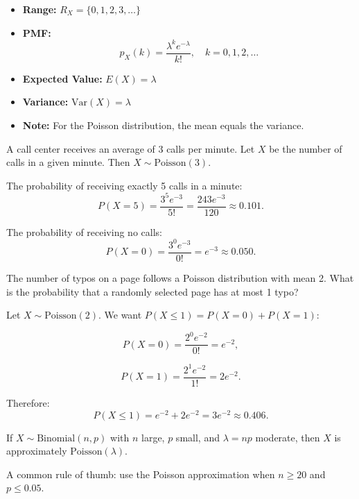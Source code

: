 \begin{itemize}
    \item \textbf{Range:} \(R_X = \{0, 1, 2, 3, \ldots\}\)
    
    \item \textbf{PMF:}
    \[
    p_X(k) = \frac{\lambda^k e^{-\lambda}}{k!}, \quad k = 0, 1, 2, \ldots
    \]
    
    \item \textbf{Expected Value:} \(E(X) = \lambda\)
    
    \item \textbf{Variance:} \(\text{Var}(X) = \lambda\)
    
    \item \textbf{Note:} For the Poisson distribution, the mean equals the variance.
\end{itemize}

\begin{eg}
A call center receives an average of 3 calls per minute. Let \(X\) be the number of calls in a given minute. Then \(X \sim \text{Poisson}(3)\).

The probability of receiving exactly 5 calls in a minute:
\[
P(X = 5) = \frac{3^5 e^{-3}}{5!} = \frac{243 e^{-3}}{120} \approx 0.101.
\]

The probability of receiving no calls:
\[
P(X = 0) = \frac{3^0 e^{-3}}{0!} = e^{-3} \approx 0.050.
\]
\end{eg}

\begin{eg}
The number of typos on a page follows a Poisson distribution with mean 2. What is the probability that a randomly selected page has at most 1 typo?

Let \(X \sim \text{Poisson}(2)\). We want \(P(X \le 1) = P(X = 0) + P(X = 1)\):

\[
P(X = 0) = \frac{2^0 e^{-2}}{0!} = e^{-2},
\]

\[
P(X = 1) = \frac{2^1 e^{-2}}{1!} = 2e^{-2}.
\]

Therefore:
\[
P(X \le 1) = e^{-2} + 2e^{-2} = 3e^{-2} \approx 0.406.
\]
\end{eg}

\begin{theorem}
If \(X \sim \text{Binomial}(n, p)\) with \(n\) large, \(p\) small, and \(\lambda = np\) moderate, then \(X\) is approximately \(\text{Poisson}(\lambda)\).

A common rule of thumb: use the Poisson approximation when \(n \ge 20\) and \(p \le 0.05\).
\end{theorem}


